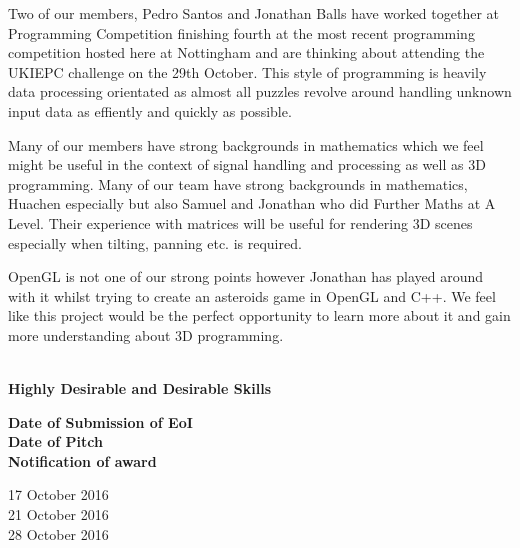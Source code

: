\documentclass[11pt, oneside]{article}
\begin{document}
Two of our members, Pedro Santos and Jonathan Balls have worked together at Programming Competition finishing fourth at the most recent programming competition hosted here at Nottingham and are thinking about attending the UKIEPC challenge on the 29th October. This style of programming is heavily data processing orientated as almost all puzzles revolve around handling unknown input data as effiently and quickly as possible.

Many of our members have strong backgrounds in mathematics which we feel might be useful in the context of signal handling and processing as well as 3D programming. Many of our team have strong backgrounds in mathematics, Huachen especially but also Samuel and Jonathan who did Further Maths at A Level. Their experience with matrices will be useful for rendering 3D scenes especially when tilting, panning etc. is required.

OpenGL is not one of our strong points however Jonathan has played around with it whilst trying to create an asteroids game in OpenGL and C++. We feel like this project would be the perfect opportunity to learn more about it and gain more understanding about 3D programming.

\\
\textbf{Highly Desirable and Desirable Skills}\\
\begin{minipage}[t]{0.5\textwidth}
    \textbf{Date of Submission of EoI}\\
    \textbf{Date of Pitch}\\
    \textbf{Notification of award}\\
    
\end{minipage}
\begin{minipage}[t]{0.5\textwidth}
    17 October 2016\\
    21 October 2016\\
    28 October 2016\\
\end{minipage}
\end{document}
